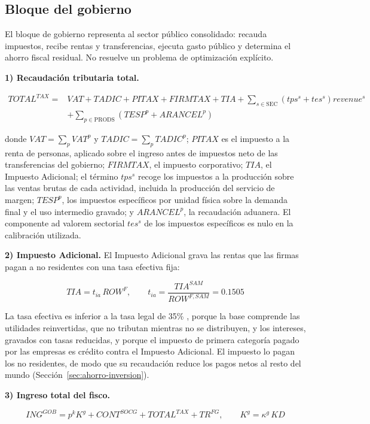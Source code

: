 \documentclass[11pt]{article}
\begin{document}
\subsection{Bloque del gobierno}
\label{sec:gobierno}

El bloque de gobierno representa al sector público consolidado: recauda impuestos, recibe rentas y transferencias, ejecuta gasto público y determina el ahorro fiscal residual. No resuelve un problema de optimización explícito.

\textbf{1) Recaudación tributaria total.}

\[
\begin{aligned}
TOTAL^{TAX}={}& VAT+TADIC+PITAX+FIRMTAX+TIA+\sum_{s\in\mathrm{SEC}}\left(tps^{s}+tes^{s}\right)revenue^{s}\\
&+\sum_{p\in\mathrm{PRODS}}\left(TESP^{p}+ARANCEL^{p}\right)
\end{aligned}
\]

donde $VAT=\sum_{p}VAT^{p}$ y $TADIC=\sum_{p}TADIC^{p}$; $PITAX$ es el impuesto a la renta de personas, aplicado sobre el ingreso antes de impuestos neto de las transferencias del gobierno; $FIRMTAX$, el impuesto corporativo; $TIA$, el Impuesto Adicional; el término $tps^{s}$ recoge los impuestos a la producción sobre las ventas brutas de cada actividad, incluida la producción del servicio de margen; $TESP^{p}$, los impuestos específicos por unidad física sobre la demanda final y el uso intermedio gravado; y $ARANCEL^{p}$, la recaudación aduanera. El componente ad valorem sectorial $tes^{s}$ de los impuestos específicos es nulo en la calibración utilizada.

\textbf{2) Impuesto Adicional.} El Impuesto Adicional grava las rentas que las firmas pagan a no residentes con una tasa efectiva fija:

\[
TIA=t_{ia}\,ROW^{F},\qquad t_{ia}=\frac{TIA^{SAM}}{ROW^{F,SAM}}=0.1505
\]

La tasa efectiva es inferior a la tasa legal de 35\% \cite{dl824}, porque la base comprende las utilidades reinvertidas, que no tributan mientras no se distribuyen, y los intereses, gravados con tasas reducidas, y porque el impuesto de primera categoría pagado por las empresas es crédito contra el Impuesto Adicional. El impuesto lo pagan los no residentes, de modo que su recaudación reduce los pagos netos al resto del mundo (Sección~\ref{sec:ahorro-inversion}).

\textbf{3) Ingreso total del fisco.}

\[
ING^{GOB}=p^{k}K^{g}+CONT^{SOCG}+TOTAL^{TAX}+TR^{FG}, \qquad K^{g}=\kappa^{g}\,KD
\]
\end{document}
